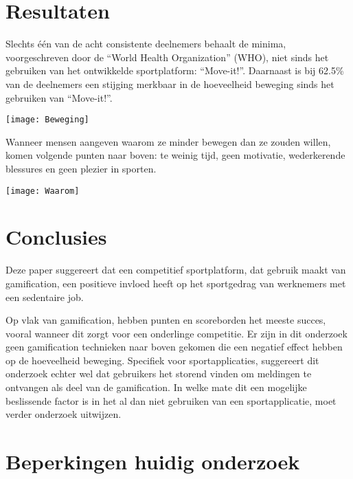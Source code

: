 \documentclass[a0,portrait]{hogent-poster}
\begin{document}
\begin{multicols}{2}
\section{Resultaten}

Slechts één van de acht consistente deelnemers behaalt de minima, voorgeschreven door de ``World Health Organization'' (WHO), niet sinds het gebruiken van het ontwikkelde sportplatform: ``Move-it!''. Daarnaast is bij 62.5\% van de deelnemers een stijging merkbaar in de hoeveelheid beweging sinds het gebruiken van ``Move-it!''.

\begin{center}
    \captionsetup{type=table}
    \texttt{[image: Beweging]}
\end{center}

Wanneer mensen aangeven waarom ze minder bewegen dan ze zouden willen, komen volgende punten naar boven: te weinig tijd, geen motivatie, wederkerende blessures en geen plezier in sporten.

\begin{center}
    \captionsetup{type=figure}
    \texttt{[image: Waarom]}
\end{center}

\section{Conclusies}

Deze paper suggereert dat een competitief sportplatform, dat gebruik maakt van
gamification, een positieve invloed heeft op het sportgedrag van werknemers met een sedentaire job.

Op vlak van gamification, hebben punten en scoreborden het meeste succes, vooral wanneer dit zorgt voor een onderlinge competitie. Er zijn in dit onderzoek geen gamification technieken naar boven gekomen die een negatief effect hebben op de hoeveelheid beweging. Specifiek voor sportapplicaties, suggereert dit onderzoek echter wel dat gebruikers het storend vinden om meldingen te ontvangen als deel van de gamification. In welke mate dit een mogelijke beslissende factor is in het al dan niet gebruiken van een sportapplicatie, moet verder onderzoek uitwijzen.

\section{Beperkingen huidig onderzoek}


\end{multicols}
\end{document}
